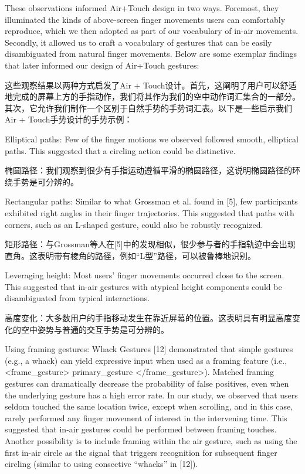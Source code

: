 These observations informed Air+Touch design in two ways. Foremost, they illuminated the kinds of above-screen finger movements users can comfortably reproduce, which we then adopted as part of our vocabulary of in-air movements. Secondly, it allowed us to craft a vocabulary of gestures that can be easily disambiguated from natural finger movements. Below are some exemplar findings that later informed our design of Air+Touch gestures: 


这些观察结果以两种方式启发了Air + Touch设计。首先，这阐明了用户可以舒适地完成的屏幕上方的手指动作，我们将其作为我们的空中动作词汇集合的一部分。其次，它允许我们制作一个区别于自然手势的手势词汇表。以下是一些启示我们Air + Touch手势设计的手势示例：

Elliptical paths: Few of the finger motions we observed followed smooth, elliptical paths. This suggested that a circling action could be distinctive.

椭圆路径：我们观察到很少有手指运动遵循平滑的椭圆路径，这说明椭圆路径的环绕手势是可分辨的。

Rectangular paths: Similar to what Grossman et al. found in [5], few participants exhibited right angles in their finger trajectories. This suggested that paths with corners, such as an L-shaped gesture, could also be robustly recognized. 

矩形路径：与Grossman等人在[5]中的发现相似，很少参与者的手指轨迹中会出现直角。这表明带有棱角的路径，例如“L型”路径，可以被鲁棒地识别。

Leveraging height: Most users’ finger movements occurred close to the screen. This suggested that in-air gestures with atypical height components could be disambiguated from typical interactions.  

高度变化：大多数用户的手指移动发生在靠近屏幕的位置。这表明具有明显高度变化的空中姿势与普通的交互手势是可分辨的。

Using framing gestures: Whack Gestures [12] demonstrated that simple gestures (e.g., a whack) can yield expressive input when used as a framing feature (i.e., <frame_gesture> primary_gesture </frame_gesture>). Matched framing gestures can dramatically decrease the probability of false positives, even when the underlying gesture has a high error rate. In our study, we observed that users seldom touched the same location twice, except when scrolling, and in this case, rarely performed any finger movement of interest in the intervening time. This suggested that in-air gestures could be performed between framing touches. Another possibility is to include framing within the air gesture, such as using the first in-air circle as the signal that triggers recognition for subsequent finger circling (similar to using consective “whacks” in [12]). 


